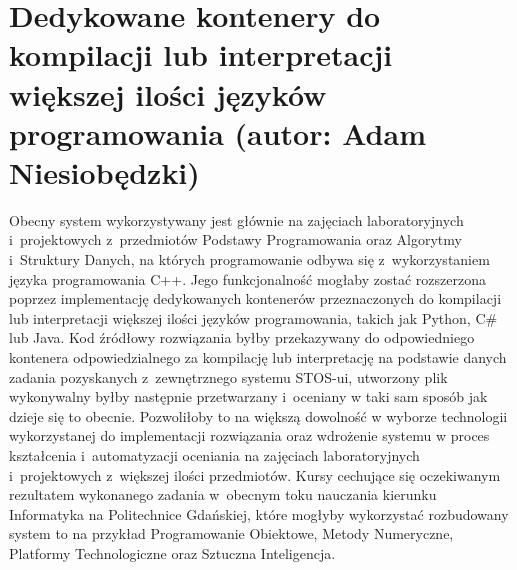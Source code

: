 \section{Dedykowane kontenery do kompilacji lub interpretacji większej ilości języków programowania (autor: Adam Niesiobędzki)}
Obecny system wykorzystywany jest głównie na zajęciach laboratoryjnych i~projektowych z~przedmiotów Podstawy Programowania oraz Algorytmy i~Struktury Danych, na których programowanie odbywa się z~wykorzystaniem języka programowania C++. Jego funkcjonalność mogłaby zostać rozszerzona poprzez implementację dedykowanych kontenerów przeznaczonych do kompilacji lub interpretacji większej ilości języków programowania, takich jak Python, C\# lub Java. Kod źródłowy rozwiązania byłby przekazywany do odpowiedniego kontenera odpowiedzialnego za kompilację lub interpretację na podstawie danych zadania pozyskanych z~zewnętrznego systemu STOS-ui, utworzony plik wykonywalny byłby następnie przetwarzany i~oceniany w taki sam sposób jak dzieje się to obecnie. Pozwoliłoby to na większą dowolność w wyborze technologii wykorzystanej do implementacji rozwiązania oraz wdrożenie systemu w proces kształcenia i~automatyzacji oceniania na zajęciach laboratoryjnych i~projektowych z~większej ilości przedmiotów. Kursy cechujące się oczekiwanym rezultatem wykonanego zadania w~obecnym toku nauczania kierunku Informatyka na Politechnice Gdańskiej, które mogłyby wykorzystać rozbudowany system to na przykład Programowanie Obiektowe, Metody Numeryczne, Platformy Technologiczne oraz Sztuczna Inteligencja.